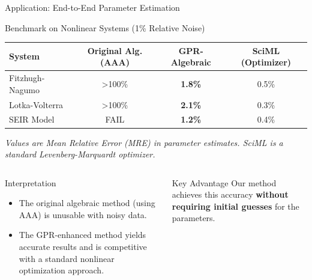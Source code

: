 \documentclass[aspectratio=169]{beamer}
\begin{document}
\begin{frame}{Application: End-to-End Parameter Estimation}
    \begin{block}{Benchmark on Nonlinear Systems (1\% Relative Noise)}
        \centering
        \small
        \begin{tabular}{@{}lccc@{}}
          \toprule
          \textbf{System} & \textbf{Original Alg. (AAA)} & \textbf{GPR-Algebraic} & \textbf{SciML (Optimizer)} \\
          \midrule
          Fitzhugh-Nagumo & \textcolor{errorred}{>100\%} & \textcolor{successgreen}{\textbf{1.8\%}} & 0.5\% \\
          Lotka-Volterra  & \textcolor{errorred}{>100\%} & \textcolor{successgreen}{\textbf{2.1\%}} & 0.3\% \\
          SEIR Model      & \textcolor{errorred}{FAIL}   & \textcolor{successgreen}{\textbf{1.2\%}} & 0.4\% \\
          \bottomrule
        \end{tabular}
        \vspace{0.5em}
        
        \footnotesize
        \textit{Values are Mean Relative Error (MRE) in parameter estimates. SciML is a standard Levenberg-Marquardt optimizer.}
    \end{block}
    
    \vspace{1em}
    
    \begin{columns}[T]
        \begin{column}{0.6\textwidth}
            \begin{alertblock}{Interpretation}
                \small
                \begin{itemize}
                    \item The original algebraic method (using AAA) is unusable with noisy data.
                    \item The GPR-enhanced method yields accurate results and is competitive with a standard nonlinear optimization approach.
                \end{itemize}
            \end{alertblock}
        \end{column}
        \begin{column}{0.4\textwidth}
             \begin{block}{Key Advantage}
                \small
                 Our method achieves this accuracy \textbf{without requiring initial guesses} for the parameters.
             \end{block}
        \end{column}
    \end{columns}
\end{frame}
\end{document}

